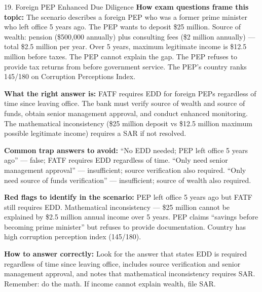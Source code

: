 \documentclass[11pt,a4paper]{beamer}
\begin{document}
	\begin{frame}{19. Foreign PEP Enhanced Due Diligence}
		\tiny
		\noindent\textbf{How exam questions frame this topic:} The scenario describes a foreign PEP who was a former prime minister who left office 5 years ago. The PEP wants to deposit \$25 million. Source of wealth: pension (\$500,000 annually) plus consulting fees (\$2 million annually) — total \$2.5 million per year. Over 5 years, maximum legitimate income is \$12.5 million before taxes. The PEP cannot explain the gap. The PEP refuses to provide tax returns from before government service. The PEP's country ranks 145/180 on Corruption Perceptions Index.
		
		\vspace{0.1cm}
		\noindent\textbf{What the right answer is:} FATF requires EDD for foreign PEPs regardless of time since leaving office. The bank must verify source of wealth and source of funds, obtain senior management approval, and conduct enhanced monitoring. The mathematical inconsistency (\$25 million deposit vs \$12.5 million maximum possible legitimate income) requires a SAR if not resolved.
		
		\vspace{0.1cm}
		\noindent\textbf{Common trap answers to avoid:} “No EDD needed; PEP left office 5 years ago” — false; FATF requires EDD regardless of time. “Only need senior management approval” — insufficient; source verification also required. “Only need source of funds verification” — insufficient; source of wealth also required.
		
		\vspace{0.1cm}
		\noindent\textbf{Red flags to identify in the scenario:} PEP left office 5 years ago but FATF still requires EDD. Mathematical inconsistency — \$25 million cannot be explained by \$2.5 million annual income over 5 years. PEP claims “savings before becoming prime minister” but refuses to provide documentation. Country has high corruption perception index (145/180).
		
		\vspace{0.1cm}
		\noindent\textbf{How to answer correctly:} Look for the answer that states EDD is required regardless of time since leaving office, includes source verification and senior management approval, and notes that mathematical inconsistency requires SAR. Remember: do the math. If income cannot explain wealth, file SAR.
	\end{frame}
	
\end{document}
